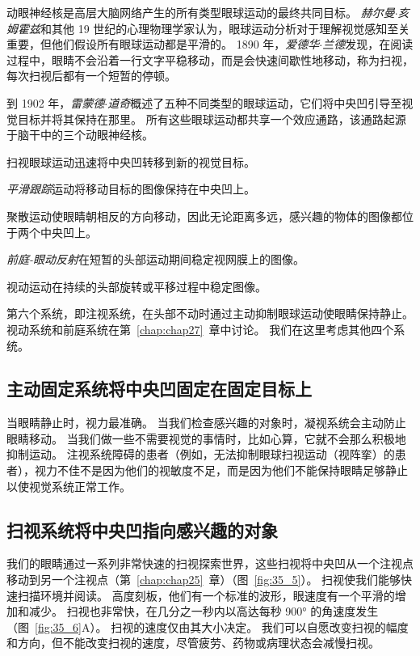 动眼神经核是高层大脑网络产生的所有类型眼球运动的最终共同目标。
\textit{赫尔曼$\cdot$亥姆霍兹}和其他 19 世纪的心理物理学家认为，眼球运动分析对于理解视觉感知至关重要，但他们假设所有眼球运动都是平滑的。
1890 年，\textit{爱德华$\cdot$兰德}发现，在阅读过程中，眼睛不会沿着一行文字平稳移动，而是会快速间歇性地移动，称为扫视，每次扫视后都有一个短暂的停顿。


到 1902 年，\textit{雷蒙德$\cdot$道奇}概述了五种不同类型的眼球运动，它们将中央凹引导至视觉目标并将其保持在那里。
所有这些眼球运动都共享一个效应通路，该通路起源于脑干中的三个动眼神经核。


扫视眼球运动迅速将中央凹转移到新的视觉目标。


\textit{平滑跟踪}运动将移动目标的图像保持在中央凹上。


聚散运动使眼睛朝相反的方向移动，因此无论距离多远，感兴趣的物体的图像都位于两个中央凹上。


\textit{前庭-眼动反射}在短暂的头部运动期间稳定视网膜上的图像。


视动运动在持续的头部旋转或平移过程中稳定图像。


第六个系统，即注视系统，在头部不动时通过主动抑制眼球运动使眼睛保持静止。
视动系统和前庭系统在第~\ref{chap:chap27}~章中讨论。
我们在这里考虑其他四个系统。



\subsection{主动固定系统将中央凹固定在固定目标上}

当眼睛静止时，视力最准确。
当我们检查感兴趣的对象时，凝视系统会主动防止眼睛移动。
当我们做一些不需要视觉的事情时，比如心算，它就不会那么积极地抑制运动。
注视系统障碍的患者（例如，无法抑制眼球扫视运动（视阵挛）的患者），视力不佳不是因为他们的视敏度不足，而是因为他们不能保持眼睛足够静止以使视觉系统正常工作。



\subsection{扫视系统将中央凹指向感兴趣的对象}

我们的眼睛通过一系列非常快速的扫视探索世界，这些扫视将中央凹从一个注视点移动到另一个注视点（第~\ref{chap:chap25}~章）（图~\ref{fig:35_5}）。
扫视使我们能够快速扫描环境并阅读。 
高度刻板，他们有一个标准的波形，眼速度有一个平滑的增加和减少。 
扫视也非常快，在几分之一秒内以高达每秒 900° 的角速度发生（图~\ref{fig:35_6}A）。 
扫视的速度仅由其大小决定。
我们可以自愿改变扫视的幅度和方向，但不能改变扫视的速度，尽管疲劳、药物或病理状态会减慢扫视。


